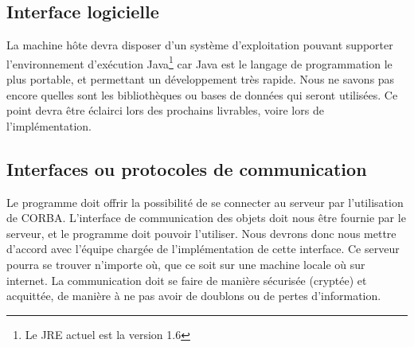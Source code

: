 	\subsection{Interface logicielle}

La machine hôte devra disposer d'un système d'exploitation pouvant supporter l'environnement d'exécution Java\footnote{Le JRE actuel est la version 1.6} car Java est le langage de programmation le plus portable, et permettant un développement très rapide.
Nous ne savons pas encore quelles sont les bibliothèques ou bases de données qui seront utilisées. Ce point devra être éclairci lors des prochains livrables, voire lors de l'implémentation.

	\subsection{Interfaces ou protocoles de communication}

Le programme doit offrir la possibilité de se connecter au serveur par l'utilisation de CORBA.
L'interface de communication des objets doit nous être fournie par le serveur, et le programme doit pouvoir l'utiliser.
Nous devrons donc nous mettre d'accord avec l'équipe chargée de l'implémentation de cette interface.
Ce serveur pourra se trouver n'importe où, que ce soit sur une machine locale où sur internet.
La communication doit se faire de manière sécurisée (cryptée) et acquittée, de manière à ne pas avoir de doublons ou de pertes d'information.

